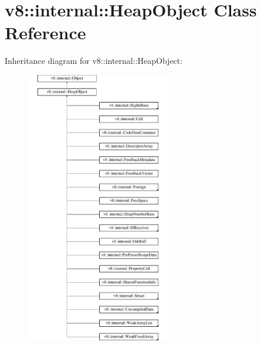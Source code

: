 \hypertarget{classv8_1_1internal_1_1HeapObject}{}\section{v8\+:\+:internal\+:\+:Heap\+Object Class Reference}
\label{classv8_1_1internal_1_1HeapObject}
Inheritance diagram for v8\+:\+:internal\+:\+:Heap\+Object\+:\begin{figure}[H]
\begin{center}
\leavevmode
\includegraphics[height=12.000000cm]{classv8_1_1internal_1_1HeapObject}
\end{center}
\end{figure}
